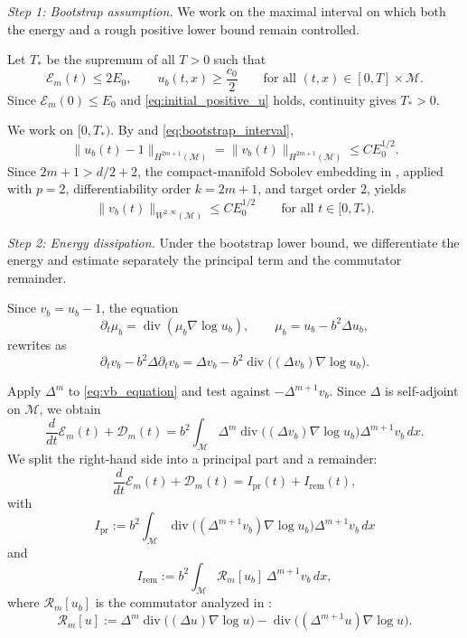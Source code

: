 \documentclass[11pt]{article}
\theoremstyle{definition}
\newcommand{\divg}{\operatorname{div}}
\def\M{\mathcal M}
\begin{document}
\medskip
\noindent\emph{Step 1: Bootstrap assumption.} We work on the maximal interval on which both the energy and a rough positive lower bound remain controlled.

Let $T_\ast$ be the supremum of all $T>0$ such that
\begin{equation}\label{eq:bootstrap_interval}
\mathcal E_m(t)\le 2E_0,
\qquad
u_b(t,x)\ge \frac{c_0}{2}
\qquad\text{for all }(t,x)\in [0,T]\times \M.
\end{equation}
Since $\mathcal E_m(0)\le E_0$ and \eqref{eq:initial_positive_u} holds,
continuity gives $T_\ast>0$.

We work on $[0,T_\ast)$. By  and \eqref{eq:bootstrap_interval},
\[
\|u_b(t)-1\|_{H^{2m+1}( \M)}
=
\|v_b(t)\|_{H^{2m+1}( \M)}
\le
C E_0^{1/2}.
\]
Since $2m+1>  d/2+2$, the compact-manifold Sobolev embedding in
\cite[Theorem~6.3]{hebey_robert_2008}, applied with $p=2$, differentiability
order $k=2m+1$, and target order $2$, yields
\begin{equation}\label{eq:bootstrap_w2infty}
\|v_b(t)\|_{W^{2,\infty}( \M)} \le C E_0^{1/2}
\qquad\text{for all } t\in[0,T_\ast).
\end{equation}

\medskip
\noindent\emph{Step 2: Energy dissipation.} Under the bootstrap lower bound, we differentiate the energy and estimate separately the principal term and the commutator remainder.

Since $v_b = u_b - 1$, the equation
\[
\partial_t \mu_b = \operatorname{div}(\mu_b \nabla \log u_b),
\qquad
\mu_b = u_b - b^2 \Delta u_b,
\]
rewrites as
\begin{equation}\label{eq:vb_equation}
\partial_t v_b - b^2 \Delta \partial_t v_b
=
\Delta v_b
-
b^2 \operatorname{div}\bigl((\Delta v_b)\nabla \log u_b\bigr).
\end{equation}

Apply $\Delta^m$ to \eqref{eq:vb_equation} and test against $-\Delta^{m+1}v_b$. Since $\Delta$ is self-adjoint on  $\M$, we obtain
\[
\frac{d}{dt}\mathcal E_m(t) + \mathcal D_m(t)
=
b^2
\int_{ \M}
\Delta^m \operatorname{div}\bigl((\Delta v_b)\nabla \log u_b\bigr)
\Delta^{m+1} v_b\, dx.
\]
We split the right-hand side into a principal part and a remainder:
\[
\frac{d}{dt}\mathcal E_m(t) + \mathcal D_m(t)
=
I_{\mathrm{pr}}(t) + I_{\mathrm{rem}}(t),
\]
with
\[
I_{\mathrm{pr}}
:=
b^2
\int_{ \M}
\operatorname{div}\bigl((\Delta^{m+1} v_b)\nabla \log u_b\bigr)
\Delta^{m+1} v_b\, dx
\]
and
\[
I_{\mathrm{rem}}
:=
b^2
\int_{ \M}
\mathcal R_m[u_b]\,\Delta^{m+1} v_b\, dx,
\]
where $\mathcal R_m[u_b]$ is the commutator analyzed in :
\[
\mathcal R_m[u]
:=
\Delta^m \divg\bigl((\Delta u)\nabla \log u\bigr)
-
\divg\bigl((\Delta^{m+1}u)\nabla \log u\bigr).
\]
\end{document}
